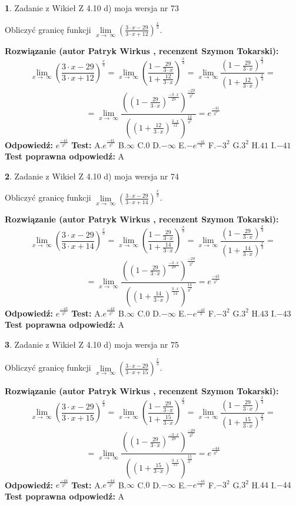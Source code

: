 \documentclass[12pt, a4paper]{article}
\theoremstyle{definition} %
\newtheorem{zad}{}
\newcommand{\zadStart}[1]{\begin{zad}#1\newline}
\newcommand{\zadStop}{\end{zad}}
\newcommand{\rozwStart}[2]{\noindent \textbf{Rozwiązanie (autor #1 , recenzent #2): }\newline}
\newcommand{\rozwStop}{\newline}
\newcommand{\odpStart}{\noindent \textbf{Odpowiedź:}\newline}
\newcommand{\odpStop}{\newline}
\newcommand{\testStart}{\noindent \textbf{Test:}\newline}
\newcommand{\testStop}{\newline}
\newcommand{\kluczStart}{\noindent \textbf{Test poprawna odpowiedź:}\newline}
\newcommand{\kluczStop}{\newline}
\begin{document}
\zadStart{Zadanie z Wikieł Z 4.10 d) moja wersja nr 73}


Obliczyć granicę funkcji  $\lim\limits_{x\to\ \infty}(\frac{3\cdot x-29}{3\cdot x+12})^{\frac{x}{3}}$.
\zadStop
\rozwStart{Patryk Wirkus}{Szymon Tokarski}
$$\lim\limits_{x\to\ \infty}(\frac{3\cdot x-29}{3\cdot x+12})^{\frac{x}{3}} = \lim\limits_{x\to\ \infty}(\frac{1-\frac{29}{3\cdot x}}{1+\frac{12}{3\cdot x}})^{\frac{x}{3}}=\lim\limits_{x\to\ \infty}\frac{(1-\frac{29}{3\cdot x})^{\frac{x}{3}}}{(1+\frac{12}{3\cdot x})^{\frac{x}{3}}}=$$
$$=\lim\limits_{x\to\ \infty}\frac{((1-\frac{29}{3\cdot x})^{\frac{-3\cdot x}{29}})^{\frac{-29}{3^{2}}}}{((1+\frac{12}{3\cdot x})^{\frac{3\cdot x}{12}})^{\frac{12}{3^{2}}}}=e^{\frac{-41}{3^{2}}}$$
\rozwStop
\odpStart
$e^{\frac{-41}{3^{2}}}$
\odpStop
\testStart
A.$e^{\frac{-41}{3^{2}}}$ B.$\infty$ C.$0$ D.$-\infty$ E.$-e^{\frac{-41}{3}}$
F.$-3^{2}$ G.$3^{2}$
H.$41$
I.$-41$
\testStop
\kluczStart
A
\kluczStop



\zadStart{Zadanie z Wikieł Z 4.10 d) moja wersja nr 74}


Obliczyć granicę funkcji  $\lim\limits_{x\to\ \infty}(\frac{3\cdot x-29}{3\cdot x+14})^{\frac{x}{3}}$.
\zadStop
\rozwStart{Patryk Wirkus}{Szymon Tokarski}
$$\lim\limits_{x\to\ \infty}(\frac{3\cdot x-29}{3\cdot x+14})^{\frac{x}{3}} = \lim\limits_{x\to\ \infty}(\frac{1-\frac{29}{3\cdot x}}{1+\frac{14}{3\cdot x}})^{\frac{x}{3}}=\lim\limits_{x\to\ \infty}\frac{(1-\frac{29}{3\cdot x})^{\frac{x}{3}}}{(1+\frac{14}{3\cdot x})^{\frac{x}{3}}}=$$
$$=\lim\limits_{x\to\ \infty}\frac{((1-\frac{29}{3\cdot x})^{\frac{-3\cdot x}{29}})^{\frac{-29}{3^{2}}}}{((1+\frac{14}{3\cdot x})^{\frac{3\cdot x}{14}})^{\frac{14}{3^{2}}}}=e^{\frac{-43}{3^{2}}}$$
\rozwStop
\odpStart
$e^{\frac{-43}{3^{2}}}$
\odpStop
\testStart
A.$e^{\frac{-43}{3^{2}}}$ B.$\infty$ C.$0$ D.$-\infty$ E.$-e^{\frac{-43}{3}}$
F.$-3^{2}$ G.$3^{2}$
H.$43$
I.$-43$
\testStop
\kluczStart
A
\kluczStop



\zadStart{Zadanie z Wikieł Z 4.10 d) moja wersja nr 75}


Obliczyć granicę funkcji  $\lim\limits_{x\to\ \infty}(\frac{3\cdot x-29}{3\cdot x+15})^{\frac{x}{3}}$.
\zadStop
\rozwStart{Patryk Wirkus}{Szymon Tokarski}
$$\lim\limits_{x\to\ \infty}(\frac{3\cdot x-29}{3\cdot x+15})^{\frac{x}{3}} = \lim\limits_{x\to\ \infty}(\frac{1-\frac{29}{3\cdot x}}{1+\frac{15}{3\cdot x}})^{\frac{x}{3}}=\lim\limits_{x\to\ \infty}\frac{(1-\frac{29}{3\cdot x})^{\frac{x}{3}}}{(1+\frac{15}{3\cdot x})^{\frac{x}{3}}}=$$
$$=\lim\limits_{x\to\ \infty}\frac{((1-\frac{29}{3\cdot x})^{\frac{-3\cdot x}{29}})^{\frac{-29}{3^{2}}}}{((1+\frac{15}{3\cdot x})^{\frac{3\cdot x}{15}})^{\frac{15}{3^{2}}}}=e^{\frac{-44}{3^{2}}}$$
\rozwStop
\odpStart
$e^{\frac{-44}{3^{2}}}$
\odpStop
\testStart
A.$e^{\frac{-44}{3^{2}}}$ B.$\infty$ C.$0$ D.$-\infty$ E.$-e^{\frac{-44}{3}}$
F.$-3^{2}$ G.$3^{2}$
H.$44$
I.$-44$
\testStop
\kluczStart
A
\kluczStop
\end{document}
